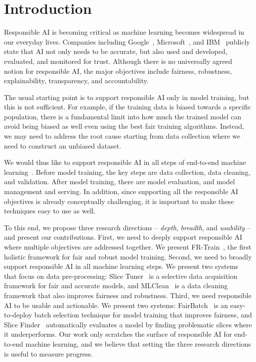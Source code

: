 \documentclass[11pt]{article}
\newcommand{\slicetuner}{Slice Tuner}
\newcommand{\fb}{FairBatch}
\newcommand{\mc}{MLClean}
\newcommand{\slicefinder}{Slice Finder}
\begin{document}
\section{Introduction}

Responsible AI is becoming critical as machine learning becomes widespread in our everyday lives. Companies including Google~\cite{google}, Microsoft~\cite{microsoft}, and IBM~\cite{ibm} publicly state that AI not only needs to be accurate, but also used and developed, evaluated, and monitored for trust. Although there is no universally agreed notion for responsible AI, the major objectives include fairness, robustness, explainability, transparency, and accountability.

The usual starting point is to support responsible AI only in model training, but this is not sufficient. For example, if the training data is biased towards a specific population, there is a fundamental limit into how much the trained model can avoid being biased as well even using the best fair training algorithms. Instead, we may need to address the root cause starting from data collection where we need to construct an unbiased dataset.

We would thus like to support responsible AI in all steps of end-to-end machine learning~\cite{DBLP:conf/kdd/BaylorBCFFHHIJK17,DBLP:journals/debu/ZahariaCD0HKMNO18}. Before model training, the key steps are data collection, data cleaning, and validation. After model training, there are model evaluation, and model management and serving. In addition, since supporting all the responsible AI objectives is already conceptually challenging, it is important to make these techniques easy to use as well.

To this end, we propose three research directions -- {\em depth}, {\em breadth}, and {\em usability} -- and present our contributions. First, we need to deeply support responsible AI where multiple objectives are addressed together. We present FR-Train~\cite{DBLP:conf/icml/RohLWS20}, the first holistic framework for fair and robust model training.
Second, we need to broadly support responsible AI in all machine learning steps. We present two systems that focus on data pre-processing: \slicetuner{}~\cite{DBLP:journals/corr/abs-2003-04549} is a selective data acquisition framework for fair and accurate models, and \mc{}~\cite{DBLP:conf/sigmod/TaeROKW19} is a data cleaning framework that also improves fairness and robustness.
Third, we need responsible AI to be usable and actionable. We present two systems: \fb{}~\cite{fairbatch} is an easy-to-deploy batch selection technique for model training that improves fairness, and \slicefinder{}~\cite{DBLP:conf/icde/ChungKPTW19,DBLP:journals/tkde/ChungKPTW20} automatically evaluates a model by finding problematic slices where it underperforms.
Our work only scratches the surface of responsible AI for end-to-end machine learning, and we believe that setting the three research directions is useful to measure progress.
\end{document}
